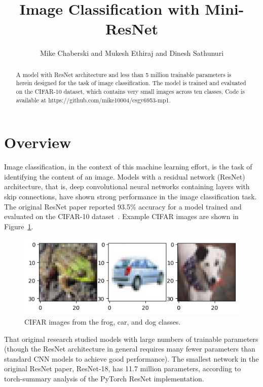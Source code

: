 \documentclass[letterpaper]{article} %
\title{Image Classification with Mini-ResNet}
\author {
    Mike Chaberski
    and
    Mukesh Ethiraj
    and
    Dinesh Sathunuri
}
\begin{document}
\maketitle

\begin{abstract}
    A model with ResNet architecture and less than 5 million trainable parameters is herein designed for the task of
    image classification.
    The model is trained and evaluated on the CIFAR-10 dataset, which contains very small images across ten classes.
    Code is available at https://github.com/mike10004/csgy6953-mp1.
\end{abstract}

\section{Overview}

Image classification, in the context of this machine learning effort, is the task of identifying the content of an image.
Models with a residual network (ResNet) architecture, that is, deep convolutional neural networks containing layers with
skip connections, have shown strong performance in the image classification task.
The original ResNet paper reported 93.5\% accuracy for a model trained and evaluated on the CIFAR-10 dataset~\cite{dblp:2015}.
Example CIFAR images are shown in Figure~\ref{fig1}.

\begin{figure}[b]
\centering
\includegraphics[width=0.95\columnwidth]{cifar-example-images}
\caption{CIFAR images from the frog, car, and dog classes.}
\label{fig1}
\end{figure}

That original research studied models with large numbers of trainable parameters (though the ResNet architecture in
general requires many fewer parameters than standard CNN models to achieve good performance).
The smallest network in the original ResNet paper, ResNet-18, has 11.7 million parameters, according to torch-summary
analysis of the PyTorch ResNet implementation.
\end{document}
